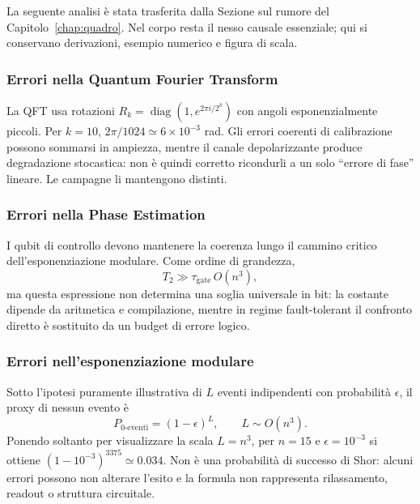 La seguente analisi è stata trasferita dalla Sezione sul rumore del
Capitolo~\ref{chap:quadro}. Nel corpo resta il nesso causale essenziale; qui si
conservano derivazioni, esempio numerico e figura di scala.

\subsubsection{Errori nella Quantum Fourier Transform}

La \ac{QFT} usa rotazioni
$R_k=\operatorname{diag}(1,e^{2\pi i/2^k})$ con angoli esponenzialmente
piccoli. Per $k=10$, $2\pi/1024\simeq6\times10^{-3}$ rad. Gli errori coerenti
di calibrazione possono sommarsi in ampiezza, mentre il canale depolarizzante
produce degradazione stocastica: non è quindi corretto ricondurli a un solo
``errore di fase'' lineare. Le campagne li mantengono distinti.

\subsubsection{Errori nella Phase Estimation}

I qubit di controllo devono mantenere la coerenza lungo il cammino critico
dell'esponenziazione modulare. Come ordine di grandezza,
\begin{equation}
    T_2\gg\tau_{\text{gate}}\,O(n^3),
\end{equation}
ma questa espressione non determina una soglia universale in bit: la costante
dipende da aritmetica e compilazione, mentre in regime fault-tolerant il
confronto diretto è sostituito da un budget di errore logico.

\subsubsection{Errori nell'esponenziazione modulare}

Sotto l'ipotesi puramente illustrativa di $L$ eventi indipendenti con
probabilità $\epsilon$, il proxy di nessun evento è
\begin{equation}
    P_{0\text{-eventi}}=(1-\epsilon)^L,\qquad L\sim O(n^3).
\end{equation}
Ponendo soltanto per visualizzare la scala $L=n^3$, per $n=15$ e
$\epsilon=10^{-3}$ si ottiene
$(1-10^{-3})^{3375}\simeq0.034$. Non è una probabilità di successo di Shor:
alcuni errori possono non alterare l'esito e la formula non rappresenta
rilassamento, readout o struttura circuitale.

